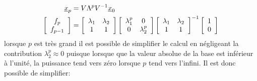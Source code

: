 \begin{align}
\underline{x}_{p} &= V \Lambda^p V^{-1} \underline{x}_{0} \\
\left[ \begin{array}{c}  
f_p \\ f_{p-1}
\end{array} \right]
&= 
\left[ \begin{array}{c c }  
\lambda_1 & \lambda_2 \\
1         & 1 \\
\end{array} \right]
\left[ \begin{array}{c c }  
\lambda_1^p & 0 \\
0         & \lambda_2^p \\
\end{array} \right]
\left[ \begin{array}{c c }  
\lambda_1 & \lambda_2 \\
1         & 1 \\
\end{array} \right]^{-1} 
\left[ \begin{array}{c}  
1 \\ 0
\end{array} \right]
\end{align}
lorsque $p$ est très grand il est possible de simplifier le calcul en négligeant la contribution $\lambda_2^p \approx 0$ puisque lorsque que la valeur absolue de la base est inférieur à l'unité, la puissance tend vers zéro lorsque $p$ tend vers l'infini. Il est donc possible de simplifier:
